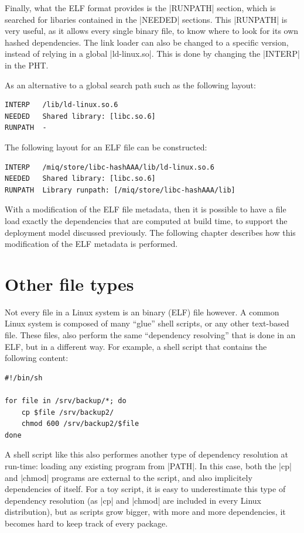 Finally, what the ELF format provides is the |RUNPATH|
section, which is searched for libaries contained in the
|NEEDED| sections. This |RUNPATH| is very useful, as it
allows every single binary file, to know where to look for
its own hashed dependencies. The link loader can also be
changed to a specific version, instead of relying in a
global |ld-linux.so|. This is done by changing the
|INTERP| in the \ac{PHT}.


As an alternative to a global search path such as the
following layout:

\begin{verbatim}
INTERP   /lib/ld-linux.so.6
NEEDED   Shared library: [libc.so.6]
RUNPATH  -
\end{verbatim}

The following layout for an ELF file can be constructed:

\begin{verbatim}
INTERP   /miq/store/libc-hashAAA/lib/ld-linux.so.6
NEEDED   Shared library: [libc.so.6]
RUNPATH  Library runpath: [/miq/store/libc-hashAAA/lib]
\end{verbatim}

With a modification of the ELF file metadata, then it is
possible to have a file load exactly the dependencies that
are computed at build time, to support the deployment model
discussed previously. The following chapter describes how
this modification of the ELF metadata is performed.

\FloatBarrier
\section{Other file types}

Not every file in a Linux system is an binary (ELF) file
however. A common Linux system is composed of many ``glue''
shell scripts, or any other text-based file. These files,
also perform the same ``dependency resolving'' that is done
in an ELF, but in a different way. For example, a shell
script that contains the following content:

\begin{verbatim}
#!/bin/sh

for file in /srv/backup/*; do
    cp $file /srv/backup2/
    chmod 600 /srv/backup2/$file
done
\end{verbatim}

A shell script like this also performes another type of
dependency resolution at run-time: loading any existing
program from |PATH|. In this case, both the |cp| and |chmod|
programs are external to the script, and also implicitely
dependencies of itself. For a toy script, it is easy to
underestimate this type of dependency resolution (as |cp|
and |chmod| are included in every Linux distribution), but
as scripts grow bigger, with more and more dependencies, it
becomes hard to keep track of every package.

